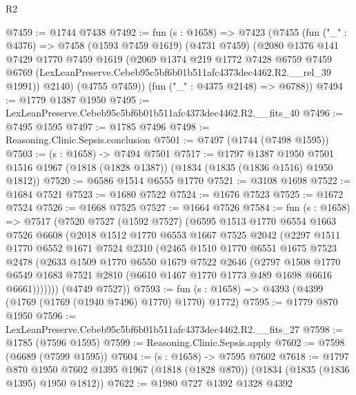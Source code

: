 \begin{lexlean}{R2}
\begin{coremodule}
@7459 := @1744 @7438
@7492 := fun (s : @1658) =>
  @7423
    (@7455
      (fun ("_" : @4376) =>
      @7458
        (@1593 @7459 @1619)
        (@4731 @7459)
        (@2080
          @1376
          @141
          @7429
          @1770
          @7459
          @1619
          (@2069
            @1374
            @219
            @1772
            @7428
            @6759
            @7459
            @6769
            (LexLeanPreserve.Cebeb95c5bf6b01b511afc4373dec4462.R2.__rel_39 @1991))
          @2140)
        (@4755 @7459))
      (fun ("_" : @4375 @2148) => @6788))
@7494 := @1779 @1387 @1950
@7495 := LexLeanPreserve.Cebeb95c5bf6b01b511afc4373dec4462.R2.__fits_40
@7496 := @7495 @1595
@7497 := @1785 @7496
@7498 := Reasoning.Clinic.Sepsis.conclusion
@7501 := @7497 (@1744 (@7498 @1595))
@7503 := (s : @1658) -> @7494 @7501
@7517 := @1797
    @1387
    @1950
    @7501
    @1516
    @1967
    (@1818 (@1828 @1387))
    (@1834 (@1835 (@1836 @1516) @1950 @1812))
@7520 := @6586 @1514 @6555 @1770
@7521 := @3108 @1698
@7522 := @1684 @7521
@7523 := @1680 @7522
@7524 := @1676 @7523
@7525 := @1672 @7524
@7526 := @1668 @7525
@7527 := @1664 @7526
@7584 := fun (s : @1658) =>
  @7517
    (@7520
      @7527
      (@1592 @7527)
      (@6595
        @1513
        @1770
        @6554
        @1663
        @7526
        @6608
        (@2018
          @1512
          @1770
          @6553
          @1667
          @7525
          @2042
          (@2297
            @1511
            @1770
            @6552
            @1671
            @7524
            @2310
            (@2465
              @1510
              @1770
              @6551
              @1675
              @7523
              @2478
              (@2633
                @1509
                @1770
                @6550
                @1679
                @7522
                @2646
                (@2797
                  @1508
                  @1770
                  @6549
                  @1683
                  @7521
                  @2810
                  (@6610 @1467 @1770 @1773 @489 @1698 @6616 @6661)))))))
      (@4749 @7527))
@7593 := fun (s : @1658) => @4393 (@4399 (@1769 (@1769 (@1940 @7496) @1770) @1770) @1772)
@7595 := @1779 @870 @1950
@7596 := LexLeanPreserve.Cebeb95c5bf6b01b511afc4373dec4462.R2.__fits_27
@7598 := @1785 (@7596 @1595)
@7599 := Reasoning.Clinic.Sepsis.apply
@7602 := @7598 (@6689 (@7599 @1595))
@7604 := (s : @1658) -> @7595 @7602
@7618 := @1797
    @870
    @1950
    @7602
    @1395
    @1967
    (@1818 (@1828 @870))
    (@1834 (@1835 (@1836 @1395) @1950 @1812))
@7622 := @1980 @727 @1392 @1328 @4392

\end{coremodule}
\end{lexlean}
